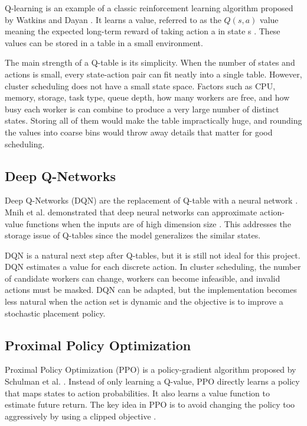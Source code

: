 Q-learning is an example of a classic reinforcement learning algorithm proposed by Watkins and Dayan \cite{watkins1992qlearning}. It learns a value, referred to as the \(Q(s,a)\) value meaning the expected long-term reward of taking action a in state s \cite{watkins1992qlearning}. These values can be stored in a table in a small environment.

The main strength of a Q-table is its simplicity. When the number of states and actions is small, every state-action pair can fit neatly into a single table. However, cluster scheduling does not have a small state space. Factors such as CPU, memory, storage, task type, queue depth, how many workers are free, and how busy each worker is can combine to produce a very large number of distinct states. Storing all of them would make the table impractically huge, and rounding the values into coarse bins would throw away details that matter for good scheduling.

\subsection{Deep Q-Networks}

Deep Q-Networks (DQN) are the replacement of Q-table with a neural network \cite{mnih2013dqn}. Mnih et al. demonstrated that deep neural networks can approximate action-value functions when the inputs are of high dimension size \cite{mnih2013dqn}. This addresses the storage issue of Q-tables since the model generalizes the similar states.

DQN is a natural next step after Q-tables, but it is still not ideal for this project. DQN estimates a value for each discrete action. In cluster scheduling, the number of candidate workers can change, workers can become infeasible, and invalid actions must be masked. DQN can be adapted, but the implementation becomes less natural when the action set is dynamic and the objective is to improve a stochastic placement policy.

\subsection{Proximal Policy Optimization}

Proximal Policy Optimization (PPO) is a policy-gradient algorithm proposed by Schulman et al. \cite{schulman2017ppo}. Instead of only learning a Q-value, PPO directly learns a policy that maps states to action probabilities. It also learns a value function to estimate future return. The key idea in PPO is to avoid changing the policy too aggressively by using a clipped objective \cite{schulman2017ppo}.

